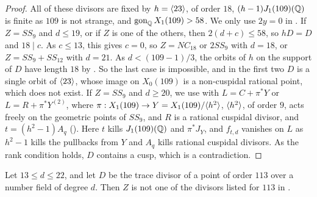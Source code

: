 \begin{proof}
All of these divisors are fixed by $h=\langle 23\rangle$, of order $18$, $(h-1)J_1(109)(\mathbb{Q})$ is finite as $109$ is not strange, and $\operatorname{gon}_{\mathbb{Q}} X_1(109)>58$. We only use $2y=0$ in . If $Z=SS_9$ and $d\leq 19$, or if $Z$ is one of the others, then $2(d+c)\leq58$, so $hD=D$ and $18\mid c$. As $c\leq13$, this gives $c=0$, so $Z=NC_{18}$ or $2SS_9$ with $d=18$, or $Z=SS_9+SS_{12}$ with $d=21$. As $d<(109-1)/3$, the orbits of $h$ on the support of $D$ have length $18$ by . So the last case is impossible, and in the first two $D$ is a single orbit of $\langle 23\rangle$, whose image on $X_0(109)$ is a non-cuspidal rational point, which does not exist. If $Z=SS_9$ and $d\geq 20$, we use  with $L=C+\pi^*Y$ or $L=R+\pi^*Y^{(2)}$, where $\pi:X_1(109)\to Y=X_1(109)/\langle h^2\rangle$, $\langle h^2\rangle$, of order $9$, acts freely on the geometric points of $SS_9$, and $R$ is a rational cuspidal divisor, and $t=(h^2-1)A_q$ (). Here $t$ kills $J_1(109)(\mathbb{Q})$ and $\pi^*J_Y$, and $f_{t,d}$ vanishes on $L$ as $h^2-1$ kills the pullbacks from $Y$ and $A_q$ kills rational cuspidal divisors. As the rank condition holds, $D$ contains a cusp, which is a contradiction.
\end{proof}

\begin{proposition}\label{prop:113}
Let $13\leq d\leq 22$, and let $D$ be the trace divisor of a point of order $113$ over a number field of degree $d$. Then $Z$ is not one of the divisors listed for $113$ in .
\end{proposition}

